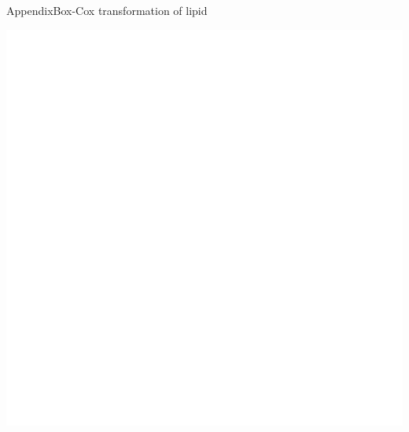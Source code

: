 \documentclass{beamer}\usepackage[]{graphicx}\usepackage[]{color}
\makeatletter
\def\maxwidth{ %
  \ifdim\Gin@nat@width>\linewidth
    \linewidth
  \else
    \Gin@nat@width
  \fi
}
\newenvironment{kframe}{%
 \def\at@end@of@kframe{}%
 \ifinner\ifhmode%
  \def\at@end@of@kframe{\end{minipage}}%
  \begin{minipage}{\columnwidth}%
 \fi\fi%
 \def\FrameCommand##1{\hskip\@totalleftmargin \hskip-\fboxsep
 \colorbox{shadecolor}{##1}\hskip-\fboxsep
     \hskip-\linewidth \hskip-\@totalleftmargin \hskip\columnwidth}%
 \MakeFramed {\advance\hsize-\width
   \@totalleftmargin\z@ \linewidth\hsize
   \@setminipage}}%
 {\par\unskip\endMakeFramed%
 \at@end@of@kframe}
\newenvironment{knitrout}{}{} %
\makeatother
\begin{document}
\begin{frame}{Appendix}{Box-Cox transformation of lipid}
\begin{knitrout}
\begin{kframe}
{\ttfamily\noindent\bfseries\color{errorcolor}{\#\# Error in FUN(X[[i]], ...): object 'log\_likelihood' not found}}\end{kframe}
\includegraphics[width=\maxwidth]{figure/unnamed-chunk-3-1} 

\end{knitrout}
\end{frame}
\end{document}
